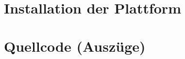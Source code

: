 \begin{appendices}
\section{Installation der Plattform}
\section{Quellcode (Auszüge)}
\end{appendices}
